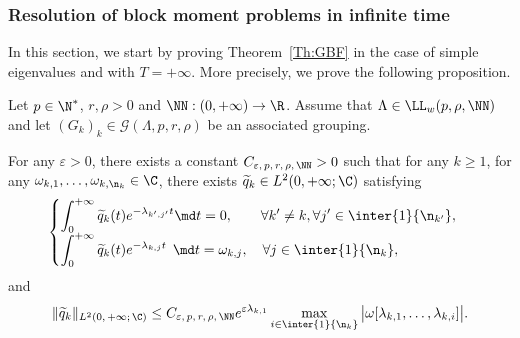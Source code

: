 \subsubsection{Resolution of block moment problems in infinite time} \label{sec:BBM_infinite}

In this section, we start by proving Theorem~\ref{Th:GBF} in the case of simple eigenvalues and with $T=+\infty$. More precisely, we prove the following proposition.

\begin{prop}\label{Prop:GBF_Infini}
Let $p \in \N^*$, $r, \rho > 0$ and $\NN : (0,+\infty) \to \R$. Assume that $\Lambda \in \LL_w(p,\rho, \NN)$ and let $(G_k)_k\in \mathcal{G}(\Lambda,p,r,\rho)$ be an associated grouping.

For any $\varepsilon > 0$, there exists a constant $C_{\varepsilon,\,p,\,r,\,\rho,\,\NN} >0$ such that for any $k \geq 1$, for any $\omega_{k,1}, \dots, \omega_{k, \n_k} \in \C$, there exists $\widetilde{q}_k \in L^2(0,+\infty; \C)$ satisfying
\begin{equation}\label{GBF_Infini_quelconque}
\begin{cases}
\displaystyle\int_0^{+\infty} \widetilde{q}_k(t) e^{-\lambda_{k',j'} t } \md t = 0, \mkern36mu \forall k' \neq k, \forall j' \in \inter{1}{\n_{k'}},
\\[0.15em]
\displaystyle\int_0^{+\infty} \widetilde{q}_k(t) e^{-\lambda_{k,j} t } \;\,\md t = \omega_{k,j}, \quad \forall j \in \inter{1}{\n_k},
\end{cases}
\end{equation}
and
\begin{equation*}\label{Estimee_GBF_Infini}
\| \widetilde{q}_k \|_{L^2(0,\,+\infty ;\,\C)} \leq C_{\varepsilon,\,p,\,r,\,\rho,\,\NN} e^{\varepsilon \lambda_{k,1}} \max \limits_{i\in \inter{1}{\n_k}} \big| \omega[\lambda_{k,1}, \dots, \lambda_{k,i}] \big|.
\end{equation*}
\end{prop}


